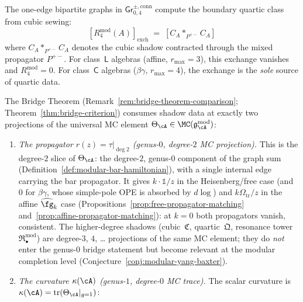 \begin{construction}
\label{constr:exchange-diagram-quartic}
The one-edge bipartite graphs in $\mathsf{Gr}^{\pm,\mathrm{conn}}_{0,4}$ compute the boundary quartic class from cubic sewing:
\[
[R^{\mathrm{mod}}_4(A)]_{\mathrm{exch}} \;=\; [C_A \ast_{P^{+-}} C_A]
\]
where $C_A \ast_{P^{+-}} C_A$ denotes the cubic shadow contracted through the mixed propagator $P^{+-}$. For class~$\mathsf{L}$ algebras (affine, $r_{\max} = 3$), this exchange vanishes and $R^{\mathrm{mod}}_4 = 0$. For class~$\mathsf{C}$ algebras ($\beta\gamma$, $r_{\max} = 4$), the exchange is the \emph{sole} source of quartic data.
\end{construction}

\begin{remark}
\label{rem:nms-bridge-consumption}
The Bridge Theorem
(Remark~\ref{rem:bridge-theorem-comparison};
Theorem~\ref{thm:bridge-criterion})
consumes shadow data at exactly two projections of the
universal MC element
$\Theta_\cA \in \MC(\mathfrak{g}_\cA^{\mathrm{mod}})$:
\begin{enumerate}[label=\textup{(\roman*)}]
\item \emph{The propagator $r(z) = \tau|_{\deg 2}$
 \textup{(}genus-$0$, degree-$2$ MC projection\textup{)}.}
 This is the degree-$2$ slice of $\Theta_\cA$: the degree-$2$,
 genus-$0$ component of the graph sum
 (Definition~\ref{def:modular-bar-hamiltonian}), with a single
 internal edge carrying the bar propagator.
 It gives $k\cdot\mathbb{1}/z$ in the Heisenberg/free case
 \textup{(}and $0$ for $\beta\gamma$, whose simple-pole OPE is
 absorbed by $d\log$\textup{)}
 and $k\Omega_{\mathrm{tr}}/z$ in the affine $\widehat{\fg}_k$ case
 (Propositions~\ref{prop:free-propagator-matching}
 and~\ref{prop:affine-propagator-matching}):
 at $k = 0$ both propagators vanish, consistent.
 The higher-degree shadows (cubic~$\mathfrak{C}$,
 quartic~$\mathfrak{Q}$,
 resonance tower~$\mathfrak{R}^{\mathrm{mod}}_\bullet$) are
 degree-$3$, $4$, \ldots{} projections of the same MC element;
 they do \emph{not} enter the genus-$0$ bridge statement
 but become relevant at the modular completion level
 (Conjecture~\ref{conj:modular-yang-baxter}).
\item \emph{The curvature $\kappa(\cA)$
 \textup{(}genus-$1$, degree-$0$ MC trace\textup{)}.}
 The scalar curvature is
 $\kappa(\cA) = \operatorname{tr}(\Theta_\cA|_{g=1})$:

\end{enumerate}
\end{remark}

